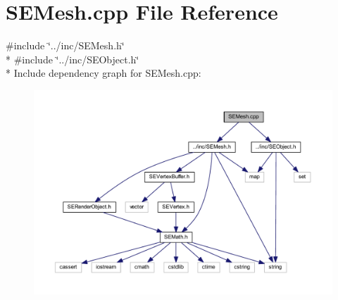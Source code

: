\section{S\+E\+Mesh.\+cpp File Reference}
\label{_s_e_mesh_8cpp}
{\ttfamily \#include \char`\"{}../inc/\+S\+E\+Mesh.\+h\char`\"{}}\\*
{\ttfamily \#include \char`\"{}../inc/\+S\+E\+Object.\+h\char`\"{}}\\*
Include dependency graph for S\+E\+Mesh.\+cpp\+:
\nopagebreak
\begin{figure}[H]
\begin{center}
\leavevmode
\includegraphics[width=350pt]{_s_e_mesh_8cpp__incl}
\end{center}
\end{figure}
